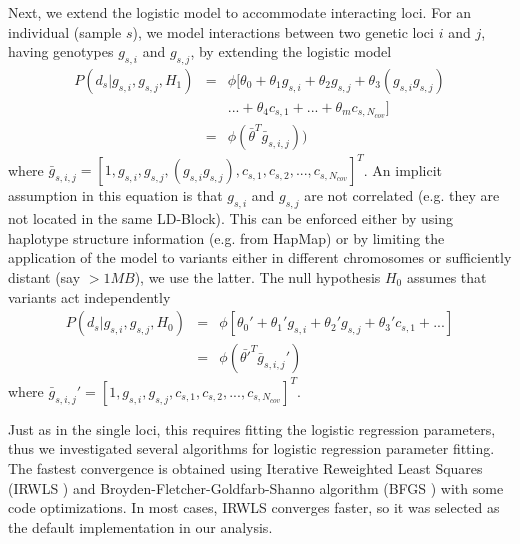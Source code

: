 Next, we extend the logistic model to accommodate interacting loci. For an individual (sample $s$), we model interactions between two genetic loci $i$ and $j$, having genotypes $g_{s,i}$ and $g_{s,j}$, by extending the logistic model
\begin{eqnarray} \label{eq:gwasLogRegH1}
    P( d_s | g_{s,i},g_{s,j}, H_1) & = & \phi[ \theta_0 + \theta_1 g_{s,i} + \theta_2 g_{s,j} + \theta_3 (g_{s,i} g_{s,j}) \\
    & & ... + \theta_4 c_{s,1} + ... + \theta_m c_{s,N_{cov}} ] \\
    & = & \phi( \bar{\theta}^T \bar{g}_{s,i,j}) )
\end{eqnarray}
\noindent where $\bar{g}_{s,i,j} =  [1, g_{s,i}, g_{s,j}, ( g_{s,i} g_{s,j}), c_{s,1}, c_{s,2}, ..., c_{s,N_{cov}} ]^T$. 
An implicit assumption in this equation is that $g_{s,i}$ and $g_{s,j}$ are not correlated (e.g. they are not located in the same LD-Block). 
This can be enforced either by using haplotype structure information (e.g. from HapMap) or by limiting the application of the model to variants either in different chromosomes or sufficiently distant (say $> 1MB$), we use the latter.
The null hypothesis $H_0$ assumes that variants act independently
\begin{eqnarray} \label{eq:gwasLogRegH0}
    P( d_s | g_{s,i},g_{s,j}, H_0) & = & \phi[ \theta_0' + \theta_1' g_{s,i} + \theta_2' g_{s,j} + \theta_3' c_{s,1} + ... ] \\
   & = & \phi( \bar{\theta'}^T \bar{g}_{s,i,j}' )
\end{eqnarray}
\noindent where $\bar{g}_{s,i,j}' =  [1, g_{s,i}, g_{s,j}, c_{s,1} , c_{s,2}, ..., c_{s,N_{cov}} ]^T$.

Just as in the single loci, this requires fitting the logistic regression parameters, thus we investigated several algorithms for logistic regression parameter fitting. 
The fastest convergence is obtained using Iterative Reweighted Least Squares (IRWLS \cite{daubechies2010iteratively}) and Broyden-Fletcher-Goldfarb-Shanno algorithm (BFGS \cite{broyden1970convergence}) with some code optimizations. In most cases, IRWLS converges faster, so it was selected as the default implementation in our analysis.


